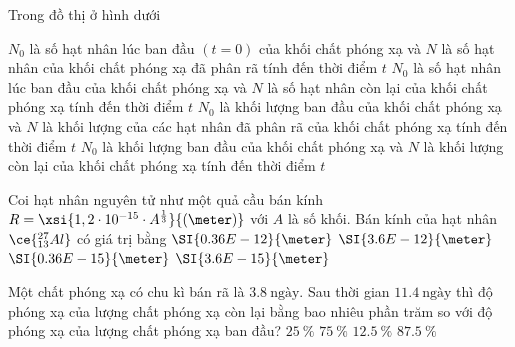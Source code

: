 \begin{ex}
	Trong đồ thị ở hình dưới
	\begin{center}
	\end{center}
	\choice
	{$N_0$ là số hạt nhân lúc ban đầu $\left(t=0\right)$ của khối chất phóng xạ và $N$ là số hạt nhân của khối chất phóng xạ đã phân rã tính đến thời điểm $t$}
	{\True $N_0$ là số hạt nhân lúc ban đầu của khối chất phóng xạ và $N$ là số hạt nhân còn lại của khối chất phóng xạ tính đến thời điểm $t$}
	{$N_0$ là khối lượng ban đầu của khối chất phóng xạ và $N$ là khối lượng của các hạt nhân đã phân rã của khối chất phóng xạ tính đến thời điểm $t$}
	{$N_0$ là khối lượng ban đầu của khối chất phóng xạ và $N$ là khối lượng còn lại của khối chất phóng xạ tính đến thời điểm $t$}
	\loigiai{}
\end{ex}
\begin{ex}
	Coi hạt nhân nguyên tử như một quả cầu bán kính $R=\xsi{1,2\cdot10^{-15}\cdot A^{\frac{1}{3}}}{\left(\meter\right)}$ với $A$ là số khối. Bán kính của hạt nhân $\ce{^{27}_{13}Al}$ có giá trị bằng
	\choice
	{$\SI{0.36E-12}{\meter}$}
	{$\SI{3.6E-12}{\meter}$}
	{$\SI{0.36E-15}{\meter}$}
	{\True $\SI{3.6E-15}{\meter}$}
	\loigiai{}
\end{ex}
\begin{ex}
Một chất phóng xạ có chu kì bán rã là $\SI{3.8}{\text{ngày}}$. Sau thời gian $\SI{11.4}{\text{ngày}}$ thì độ phóng xạ của lượng chất phóng xạ còn lại bằng bao nhiêu phần trăm so với độ phóng xạ của lượng chất  phóng xạ ban đầu?
	\choice
	{$\SI{25}{\percent}$}
{$\SI{75}{\percent}$}
	{\True $\SI{12.5}{\percent}$}
	{$\SI{87,5}{\percent}$}
\end{ex}

